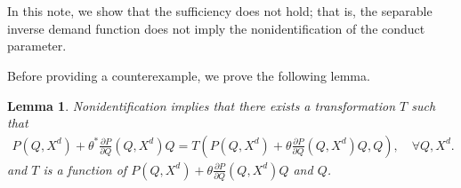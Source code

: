 \documentclass[11pt, a4paper]{article}
\newtheorem{lemma}{Lemma}
\theoremstyle{remark}
\begin{document}
\section{}
In this note, we show that the sufficiency does not hold; that is, the separable inverse demand function does not imply the nonidentification of the conduct parameter.

Before providing a counterexample, we prove the following lemma.
\begin{lemma}
    Nonidentification implies that there exists a transformation $T$ such that
    \begin{align}
        P(Q, X^{d}) + \theta^{*} \frac{\partial P}{\partial Q}(Q, X^{d}) Q = T\left(P(Q, X^{d}) + \theta \frac{\partial P}{\partial Q}(Q, X^{d}) Q, Q\right), \quad \forall Q, X^{d}.
    \end{align}
    and $T$ is a function of $P(Q, X^{d}) + \theta \frac{\partial P}{\partial Q}(Q, X^{d}) Q$ and $Q$.
\end{lemma}
\end{document}
